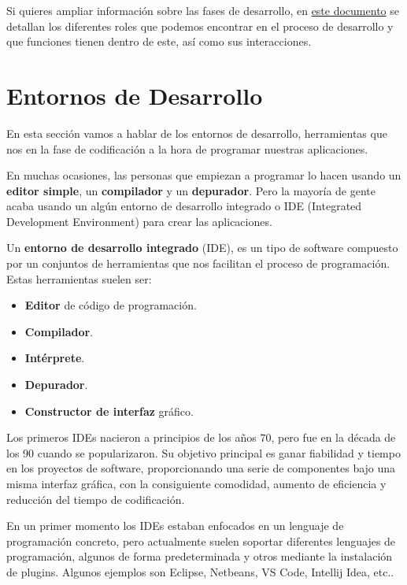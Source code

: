 Si quieres ampliar información sobre las fases de desarrollo, en \href{http://profayadira.yolasite.com/resources/Roles_desarrollo_software.pdf}{este documento} se detallan los diferentes roles que podemos encontrar en el proceso de desarrollo y que funciones tienen dentro de este, así como sus interacciones.

\section{Entornos de Desarrollo}
En esta sección vamos a hablar de los entornos de desarrollo, herramientas que nos en la fase de codificación a la hora de programar nuestras aplicaciones.

En muchas ocasiones, las personas que empiezan a programar lo hacen usando un \textbf{editor simple}, un \textbf{compilador} y un \textbf{depurador}. Pero la mayoría de gente acaba usando un algún entorno de desarrollo integrado o IDE (Integrated Development Environment) para crear las aplicaciones.

Un \textbf{entorno de desarrollo integrado} (IDE), es un tipo de software compuesto por un conjuntos de herramientas que nos facilitan el proceso de programación. Estas herramientas suelen ser:

\begin{itemize}
    \item \textbf{Editor} de código de programación.
    \item \textbf{Compilador}.
    \item \textbf{Intérprete}.
    \item \textbf{Depurador}.
    \item \textbf{Constructor de interfaz} gráfico.
\end{itemize}

Los primeros IDEs nacieron a principios de los años 70, pero fue en la década de los 90 cuando se popularizaron. Su objetivo principal es ganar fiabilidad y tiempo en los proyectos de software, proporcionando una serie de componentes bajo una misma interfaz gráfica, con la consiguiente comodidad, aumento de eficiencia y reducción del tiempo de codificación.

En un primer momento los IDEs estaban enfocados en un lenguaje de programación concreto, pero actualmente suelen soportar diferentes lenguajes de programación, algunos de forma predeterminada y otros mediante la instalación de plugins. Algunos ejemplos son Eclipse, Netbeans, VS Code, Intellij Idea, etc..

